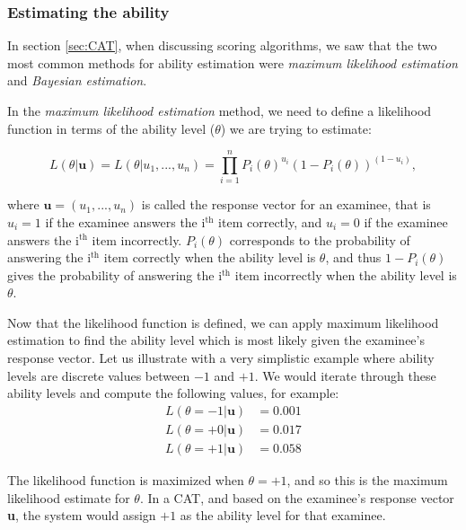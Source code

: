 \subsubsection{Estimating the ability}
In section \ref{sec:CAT}, when discussing scoring algorithms, we saw that the two most common methods for ability estimation were \textit{maximum likelihood estimation} and \textit{Bayesian estimation}.\newline

In the \textit{maximum likelihood estimation} method, we need to define a likelihood function in terms of the ability level ($\theta$) we are trying to estimate:

\begin{equation*}
L(\theta | \textbf{u}) = L(\theta | u_1, ..., u_n) = \prod_{i=1}^n P_i(\theta)^{u_i}(1 - P_i(\theta))^{(1 - u_i)} ,
\end{equation*}

where $\textbf{u}=(u_1, ..., u_n)$ is called the response vector for an examinee, that is $u_i=1$ if the examinee answers the i$^\text{th}$ item correctly, and $u_i=0$ if the examinee answers the i$^\text{th}$ item incorrectly. $P_i(\theta)$ corresponds to the probability of answering the i$^\text{th}$ item correctly when the ability level is $\theta$, and thus $1 - P_i(\theta)$ gives the probability of answering the i$^\text{th}$ item incorrectly when the ability level is $\theta$. \newline

Now that the likelihood function is defined, we can apply maximum likelihood estimation to find the ability level which is most likely given the examinee's response vector. Let us illustrate with a very simplistic example where ability levels are discrete values between $-1$ and $+1$. We would iterate through these ability levels and compute the following values, for example:
\begin{align*}
L(\theta=-1 | \textbf{u}) &= 0.001 \\
L(\theta=+0 | \textbf{u}) &= 0.017 \\
L(\theta=+1 | \textbf{u}) &= 0.058
\end{align*}

The likelihood function is maximized when $\theta = +1$, and so this is the maximum likelihood estimate for $\theta$. In a CAT, and based on the examinee's response vector \textbf{u}, the system would assign $+1$ as the ability level for that examinee.\newline


